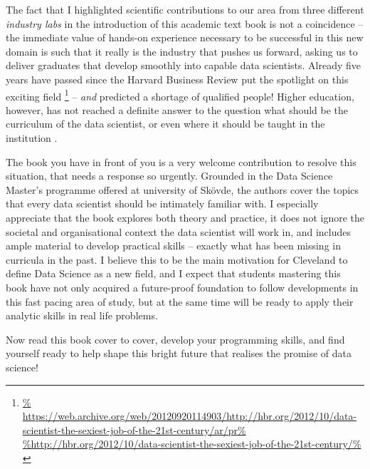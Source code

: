 \documentclass[12pt]{article}
\begin{document}
The fact that I highlighted scientific contributions to our area from three different \emph{industry labs} in the introduction of this academic text book is not a coincidence -- the immediate value of hands-on experience necessary to be successful in this new domain is such that it really is the industry that pushes us forward, asking us to deliver graduates that develop smoothly into capable data scientists.
Already five years have passed since the Harvard Business Review put the spotlight on this exciting field%
\footnote{\url{%
https://web.archive.org/web/20120920114903/http://hbr.org/2012/10/data-scientist-the-sexiest-job-of-the-21st-century/ar/pr%
}} 
 -- \emph{and} predicted a shortage of qualified people! Higher education, however, has not reached a definite answer to the question what should be the curriculum of the data scientist, or even where it should be taught in the institution \cite{DBLP:journals/cacm/BermanRHCDEFMRS18}.

The book you have in front of you is a very welcome contribution to resolve this situation, that needs a response so urgently. Grounded in the Data Science Master's programme offered at university of Sk\"ovde, the authors cover the topics that every data scientist should be intimately familiar with. I especially appreciate that the book explores both theory and practice, it does not ignore the societal and organisational context the data scientist will work in, and includes ample material to develop practical skills -- exactly what has been missing in curricula in the past. I believe this to be the main motivation for Cleveland to define Data Science as a new field, and I expect that students mastering this book have not only acquired a future-proof foundation to follow developments in this fast pacing area of study, but at the same time will be ready to apply their analytic skills in real life problems.

Now read this book cover to cover, develop your programming skills, and find yourself ready to help shape this bright future that realises the promise of data science!



\end{document}
